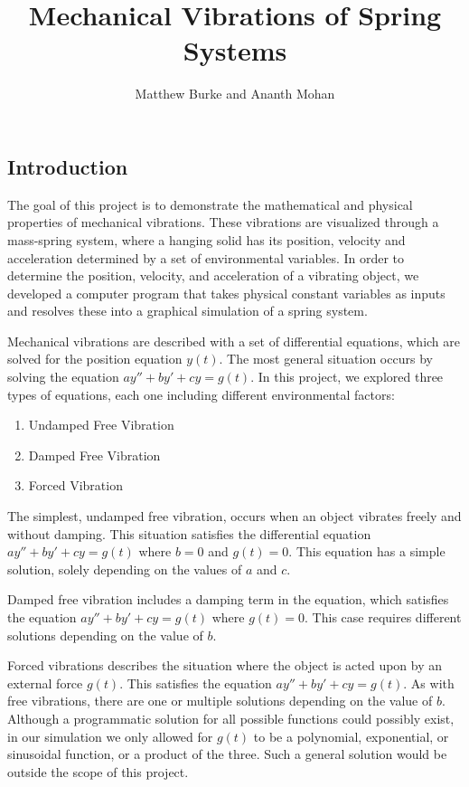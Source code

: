 \documentclass[11pt]{article} %
\title{Mechanical Vibrations of Spring Systems}
\author{Matthew Burke and Ananth Mohan}
\begin{document}
\maketitle

\begin{multicols}{2}

\begin{flushleft}
\section{Introduction}

The goal of this project is to demonstrate the mathematical and physical properties of mechanical vibrations. These vibrations are visualized through a mass-spring system, where a hanging solid has its position, velocity and acceleration determined by a set of environmental variables. In order to determine the position, velocity, and acceleration of a vibrating object, we developed a computer program that takes physical constant variables as inputs and resolves these into a graphical simulation of a spring system.

Mechanical vibrations are described with a set of differential equations, which are solved for the position equation $y(t)$. The most general situation occurs by solving the equation $ay'' + by' + cy = g(t)$. In this project, we explored three types of equations, each one including different environmental factors:

\begin{enumerate}
	\item Undamped Free Vibration

	\item Damped Free Vibration

	\item Forced Vibration

\end{enumerate} 

The simplest, undamped free vibration, occurs when an object vibrates freely and without damping. This situation satisfies the differential equation $ay'' + by' + cy = g(t)$ where $b = 0$ and $g(t) = 0$. This equation has a simple solution, solely depending on the values of $a$ and $c$.

Damped free vibration includes a damping term in the equation, which satisfies the equation $ay'' + by' + cy = g(t)$ where $g(t) = 0$. This case requires different solutions depending on the value of $b$.

Forced vibrations describes the situation where the object is acted upon by an external force $g(t)$. This satisfies the equation $ay'' + by' + cy = g(t)$. As with free vibrations, there are one or multiple solutions depending on the value of $b$. Although a programmatic solution for all possible functions could possibly exist, in our simulation we only allowed for $g(t)$ to be a polynomial, exponential, or sinusoidal function, or a product of the three. Such a general solution would be outside the scope of this project.


\end{flushleft}
\end{multicols}
\end{document}
